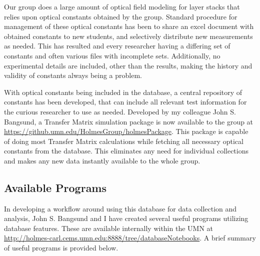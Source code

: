 \documentclass[../thesis.tex]{subfiles}
\begin{document}
Our group does a large amount of optical field modeling for layer stacks that relies upon optical constants obtained by the group.
Standard procedure for management of these optical constants has been to share an excel document with obtained constants to new students, and selectively distribute new measurements as needed.
This has resulted and every researcher having a differing set of constants and often various files with incomplete sets.
Additionally, no experimental details are included, other than the results, making the history and validity of constants always being a problem.

With optical constants being included in the database, a central repository of constants has been developed, that can include all relevant test information for the curious researcher to use as needed.
Developed by my colleague John S. Bangsund, a Transfer Matrix simulation package is now available to the group at \url{https://github.umn.edu/HolmesGroup/holmesPackage}.
This package is capable of doing most Transfer Matrix calculations while fetching all necessary optical constants from the database.
This eliminates any need for individual collections and makes any new data instantly available to the whole group.

\subsection{Available Programs}

In developing a workflow around using this database for data collection and analysis, John S. Bangsund and I have created several useful programs utilizing database features.
These are available internally within the UMN at \url{http://holmes-carl.cems.umn.edu:8888/tree/databaseNotebooks}.
A brief summary of useful programs is provided below.
\end{document}
